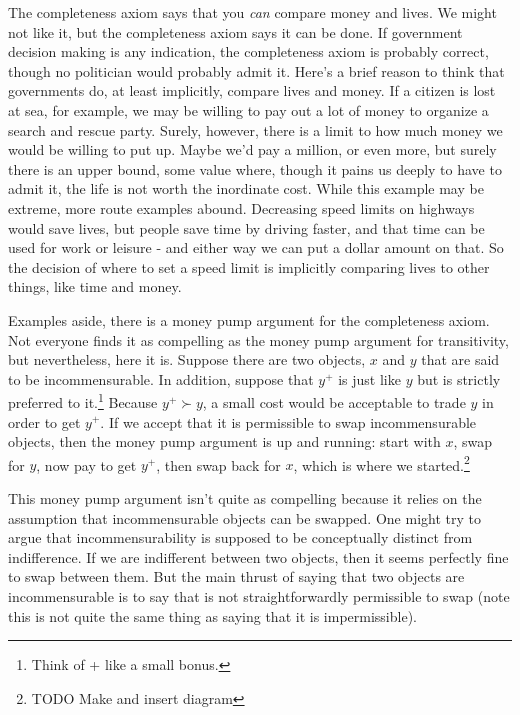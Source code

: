 \documentclass[]{tufte-book}
\begin{document}
The completeness axiom says that you \emph{can} compare money and lives. We might not like it, but the completeness axiom says it can be done. If government decision making is any indication, the completeness axiom is probably correct, though no politician would probably admit it. Here's a brief reason to think that governments do, at least implicitly, compare lives and money. If a citizen is lost at sea, for example, we may be willing to pay out a lot of money to organize a search and rescue party. Surely, however, there is a limit to how much money we would be willing to put up. Maybe we'd pay a million, or even more, but surely there is an upper bound, some value where, though it pains us deeply to have to admit it, the life is not worth the inordinate cost. While this example may be extreme, more route examples abound. Decreasing speed limits on highways would save lives, but people save time by driving faster, and that time can be used for work or leisure - and either way we can put a dollar amount on that. So the decision of where to set a speed limit is implicitly comparing lives to other things, like time and money.

Examples aside, there is a money pump argument for the completeness axiom. Not everyone finds it as compelling as the money pump argument for transitivity, but nevertheless, here it is. Suppose there are two objects, \(x\) and \(y\) that are said to be incommensurable. In addition, suppose that \(y^+\) is just like \(y\) but is strictly preferred to it.\footnote{Think of + like a small bonus.} Because \(y^+ \succ y\), a small cost would be acceptable to trade \(y\) in order to get \(y^+\). If we accept that it is permissible to swap incommensurable objects, then the money pump argument is up and running: start with \(x\), swap for \(y\), now pay to get \(y^+\), then swap back for \(x\), which is where we started.\footnote{TODO Make and insert diagram}

This money pump argument isn't quite as compelling because it relies on the assumption that incommensurable objects can be swapped. One might try to argue that incommensurability is supposed to be conceptually distinct from indifference. If we are indifferent between two objects, then it seems perfectly fine to swap between them. But the main thrust of saying that two objects are incommensurable is to say that is not straightforwardly permissible to swap (note this is not quite the same thing as saying that it is impermissible).
\end{document}
